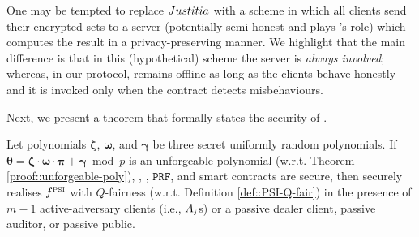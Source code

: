  
 
 
 
 

One may be tempted to replace ${Justitia}$ with a scheme in which all clients send their encrypted sets to a server (potentially semi-honest and plays \aud's role) which computes the result in a privacy-preserving manner.  We highlight that the main difference is that in this (hypothetical) scheme the server is \emph{always involved};  whereas, in our protocol, \aud remains offline as long as the clients behave honestly and it is invoked only when the contract detects misbehaviours.  
 
 
 Next, we present a theorem that formally states the security of \fpsi. 
 
 \begin{theorem}\label{theorem::F-PSI-security}
Let polynomials $\bm\zeta$, $\bm\omega$, and $\bm\gamma$ be three secret uniformly random polynomials. If  $\bm\theta=\bm\zeta\cdot \bm\omega\cdot\bm \pi+\bm \gamma \bmod p$ is an unforgeable polynomial (w.r.t. Theorem \ref{proof::unforgeable-poly}), \zspaa, \vopr,  $\mathtt{PRF}$, and smart contracts are secure, then \fpsi securely realises  $f^{\scriptscriptstyle \text{PSI}}$ with $Q$-fairness (w.r.t. Definition \ref{def::PSI-Q-fair}) in the presence of $m-1$  active-adversary clients (i.e., $A_{\scriptscriptstyle j}$s) or a passive dealer client, passive auditor, or passive public. 
 \end{theorem}
 






 
 
 